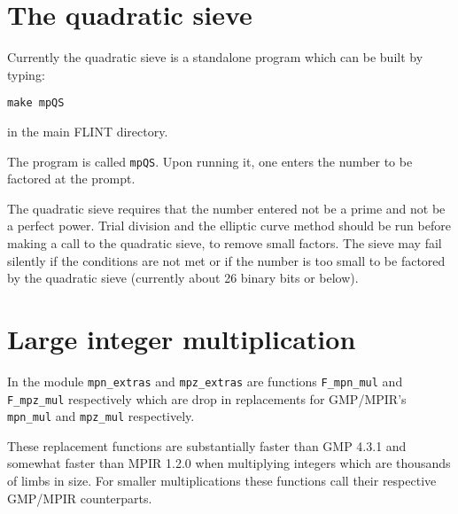 \documentclass[a4paper,10pt]{article}
\newcommand{\code}{\lstinline}
\begin{document}
\section{The quadratic sieve}
Currently the quadratic sieve is a standalone program which can be built by typing:

\code{make mpQS}

in the main FLINT directory.

The program is called \code{mpQS}. Upon running it, one enters the number to be factored at the prompt. 

The quadratic sieve requires that the number entered not be a prime and not be a perfect power. Trial division and the elliptic curve method should be run before making a call to the quadratic sieve, to remove small factors. The sieve may fail silently if the conditions are not met or if the number is too small to be factored by the quadratic sieve (currently about 26 binary bits or below).

\section{Large integer multiplication}
In the module \code{mpn_extras} and \code{mpz_extras} are functions \code{F_mpn_mul} and \code{F_mpz_mul} respectively which are drop in replacements for GMP/MPIR's \code{mpn_mul} and \code{mpz_mul} respectively. 

These replacement functions are substantially faster than GMP 4.3.1 and somewhat faster than MPIR 1.2.0 when multiplying integers which are thousands of limbs in size. For smaller multiplications these functions call their respective GMP/MPIR counterparts.



\end{document}
